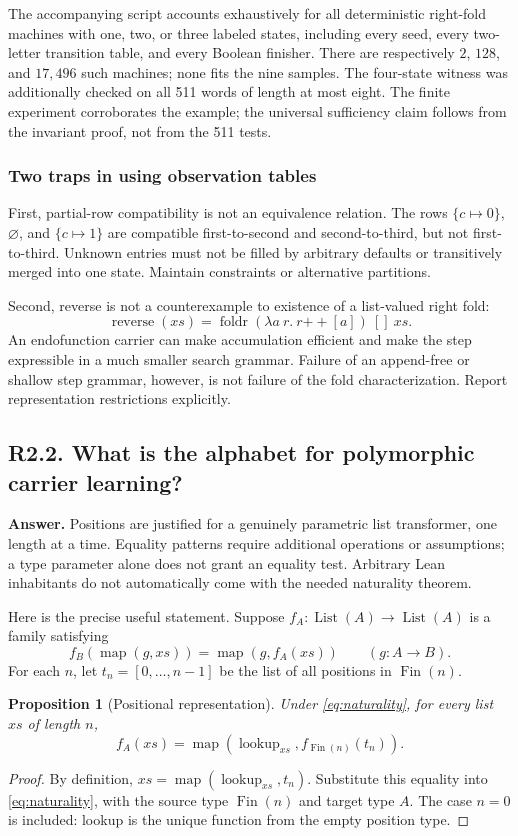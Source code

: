 \documentclass[11pt,a4paper]{article}
\newcommand{\question}[2]{\subsection{#1. #2}\label{q:#1}}
\newcommand{\foldr}{\operatorname{foldr}}
\newcommand{\map}{\operatorname{map}}
\newcommand{\List}{\operatorname{List}}
\newtheorem{proposition}[theorem]{Proposition}
\theoremstyle{definition}
\theoremstyle{remark}
\begin{document}
The accompanying script accounts exhaustively for all deterministic right-fold machines with one, two, or three labeled states, including every seed, every two-letter transition table, and every Boolean finisher. There are respectively $2$, $128$, and $17{,}496$ such machines; none fits the nine samples. The four-state witness was additionally checked on all 511 words of length at most eight. The finite experiment corroborates the example; the universal sufficiency claim follows from the invariant proof, not from the 511 tests.

\subsubsection*{Two traps in using observation tables}

First, partial-row compatibility is not an equivalence relation. The rows $\{c\mapsto0\}$, $\varnothing$, and $\{c\mapsto1\}$ are compatible first-to-second and second-to-third, but not first-to-third. Unknown entries must not be filled by arbitrary defaults or transitively merged into one state. Maintain constraints or alternative partitions.

Second, reverse is not a counterexample to existence of a list-valued right fold:
\[
 \operatorname{reverse}(xs)=
 \foldr(\lambda a\ r.\ r\mathbin{+\!+}[a])\ []\ xs.
\]
An endofunction carrier can make accumulation efficient and make the step expressible in a much smaller search grammar. Failure of an append-free or shallow step grammar, however, is not failure of the fold characterization. Report representation restrictions explicitly.

\question{R2.2}{What is the alphabet for polymorphic carrier learning?}

\textbf{Answer.} Positions are justified for a genuinely parametric list transformer, one length at a time. Equality patterns require additional operations or assumptions; a type parameter alone does not grant an equality test. Arbitrary Lean inhabitants do not automatically come with the needed naturality theorem.

Here is the precise useful statement. Suppose $f_A:\List(A)\to\List(A)$ is a family satisfying
\begin{equation}\label{eq:naturality}
 f_B(\map(g,xs))=\map(g,f_A(xs))
 \qquad(g:A\to B).
\end{equation}
For each $n$, let $t_n=[0,\ldots,n-1]$ be the list of all positions in $\operatorname{Fin}(n)$.

\begin{proposition}[Positional representation]\label{prop:positions}
Under \eqref{eq:naturality}, for every list $xs$ of length $n$,
\[
 f_A(xs)=\map(\operatorname{lookup}_{xs},f_{\operatorname{Fin}(n)}(t_n)).
\]
\end{proposition}
\begin{proof}
By definition, $xs=\map(\operatorname{lookup}_{xs},t_n)$. Substitute this equality into \eqref{eq:naturality}, with the source type $\operatorname{Fin}(n)$ and target type $A$. The case $n=0$ is included: lookup is the unique function from the empty position type.
\end{proof}
\end{document}
